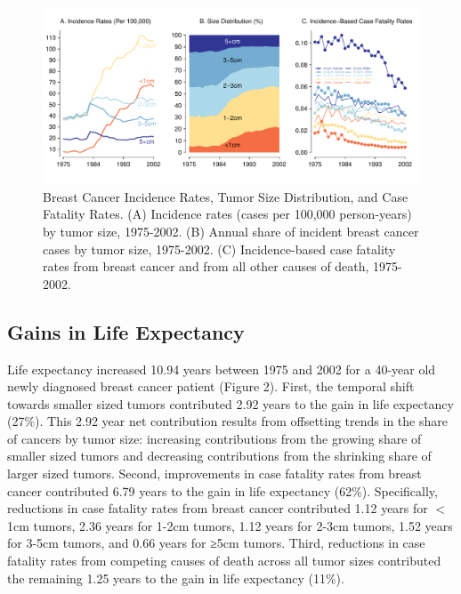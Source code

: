 \documentclass[11pt,letterpaper]{article}
\theoremstyle{plain}
\theoremstyle{remark}
\numberwithin{equation}{section}
\begin{document}
\begin{figure}[h]
\begin{center}
\includegraphics[width=\linewidth]{figure1}
\caption{Breast Cancer Incidence Rates, Tumor Size
  Distribution, and Case Fatality Rates.  (A) Incidence rates (cases
  per 100,000 person-years) by tumor size, 1975-2002.  (B) Annual
  share of incident breast cancer cases by tumor size, 1975-2002.  (C)
  Incidence-based case fatality rates from breast cancer and from all
  other causes of death, 1975-2002.}
\label{fig:simple_case}
\end{center}
\end{figure}

\subsection{Gains in Life Expectancy}
Life expectancy increased 10.94 years between 1975 and 2002 for a
40-year old newly diagnosed breast cancer patient (Figure 2).  First,
the temporal shift towards smaller sized tumors contributed 2.92 years
to the gain in life expectancy (27\%).  This 2.92 year net
contribution results from offsetting trends in the share of cancers by
tumor size: increasing contributions from the growing share of smaller
sized tumors and decreasing contributions from the shrinking share of
larger sized tumors.  Second, improvements in case fatality rates from
breast cancer contributed 6.79 years to the gain in life expectancy
(62\%).  Specifically, reductions in case fatality rates from breast
cancer contributed 1.12 years for $<$1cm tumors, 2.36 years for 1-2cm
tumors, 1.12 years for 2-3cm tumors, 1.52 years for 3-5cm tumors, and
0.66 years for ≥5cm tumors.  Third, reductions in case fatality rates
from competing causes of death across all tumor sizes contributed the
remaining 1.25 years to the gain in life expectancy (11\%).
\end{document}
